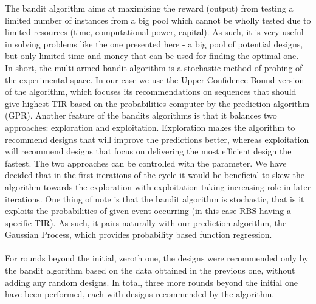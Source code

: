 \documentclass{article}
\begin{document}
The bandit algorithm aims at maximising the reward (output) from testing a limited number of instances from a big pool which cannot be wholly tested due to limited resources (time, computational power, capital). As such, it is very useful in solving problems like the one presented here - a big pool of potential designs, but only limited time and money that can be used for finding the optimal one.\\
In short, the multi-armed bandit algorithm is a stochastic method of probing of the experimental space. In our case we use the Upper Confidence Bound version of the algorithm, which focuses its recommendations on sequences that should give highest TIR based on the probabilities computer by the prediction algorithm (GPR). Another feature of the bandits algorithms is that it balances two approaches: exploration and exploitation. Exploration makes the algorithm to recommend designs that will improve the predictions better, whereas exploitation will recommend designs that focus on delivering the most efficient design the fastest. The two approaches can be controlled with the \textbeta\enspace parameter. We have decided that in the first iterations of the cycle it would be beneficial to skew the algorithm towards the exploration with exploitation taking increasing role in later iterations. One thing of note is that the bandit algorithm is stochastic, that is it exploits the probabilities of given event occurring (in this case RBS having a specific TIR). As such, it pairs naturally with our prediction algorithm, the Gaussian Process, which provides probability based function regression.\\
\\
For rounds beyond the initial, zeroth one, the designs were recommended only by the bandit algorithm based on the data obtained in the previous one, without adding any random designs. In total, three more rounds beyond the initial one have been performed, each with designs recommended by the algorithm. 
\end{document}
